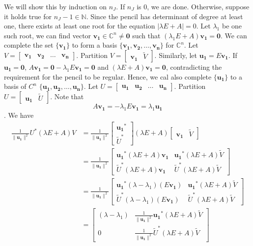 \documentclass{article}
\newcommand{\0}{\mathbf{0}}
\newcommand{\pen}[2]{\lambda#1+#2}
\newcommand{\penEA}{\pen{E}{A}}
\newcommand{\C}{\mathbb{C}}
\newcommand{\N}{\mathbb{N}}
\renewcommand{\vec}{\mathbf}
\begin{document}
We will show this by induction on $n_J$.
If $n_J$ is $0$, we are done.
Otherwise, suppose it holds true for $n_J-1 \in \N$.
Since the pencil has determinant of degree at least one, there exists at least one root for the equation $|\penEA|=0$.
Let $\lambda_1$ be one such root, we can find vector $\vec{v_1} \in \C^n \neq \0$ such that $(\lambda_1E+A)\vec{v_1}=\0$.
We can complete the set $\{\vec{v_1}\}$ to form a basis $\{\vec{v_1},\vec{v_2},\dots,\vec{v_n}\}$ for $\C^n$.
Let $V=\left[\begin{matrix}\vec{v_1}&\vec{v_2}&\dots&\vec{v_n}\end{matrix}\right]$.
Partition $V=\left[\begin{matrix}\vec{v_1}&\tilde{V}\end{matrix}\right]$.
Similarly, let $\vec{u_1}=E\vec{v_1}$.
If $\vec{u_1}=\0$, $A\vec{v_1}=\0-\lambda_1E\vec{v_1}=\0$ and $(\penEA)\vec{v_1}=\0$, contradicting the requirement for the pencil to be regular.
Hence, we cal also complete $\{\vec{u_1}\}$ to a basis of $C^n$ $\{\vec{u_1},\vec{u_2},\dots,\vec{u_n}\}$.
Let $U=\left[\begin{matrix}\vec{u_1}&\vec{u_2}&\dots&\vec{u_n}\end{matrix}\right]$. Partition $U=\left[\begin{matrix}\vec{u_1}&\tilde{U}\end{matrix}\right]$.
Note that \[A\vec{v_1}=-\lambda_1E\vec{v_1}=\lambda_1\vec{u_1}\].
We have
\begin{align*}
    \frac{1}{\lVert\vec{u_1}\rVert^2}U^*(\lambda E + A)V
    &=\frac{1}{\lVert\vec{u_1}\rVert^2}\begin{bmatrix}\vec{u_1}^*\\\tilde{U}^*\end{bmatrix}(\lambda E+A)\begin{bmatrix}\vec{v_1}&\tilde{V}\end{bmatrix}\\
    &=\frac{1}{\lVert\vec{u_1}\rVert^2}\begin{bmatrix}\vec{u_1}^*(\lambda E+A)\vec{v_1}&\vec{u_1}^*(\lambda E+A)\tilde{V}\\\tilde{U}^*(\lambda E+A)\vec{v_1}&\tilde{U}^*(\lambda E+A)\tilde{V}\end{bmatrix}\\
    &=\frac{1}{\lVert\vec{u_1}\rVert^2}\begin{bmatrix}\vec{u_1}^*(\lambda-\lambda_1)(E\vec{v_1})&\vec{u_1}^*(\lambda E+A)\tilde{V}\\\tilde{U}^*(\lambda-\lambda_1)(E\vec{v_1})&\tilde{U}^*(\lambda E+A)\tilde{V}\end{bmatrix}\\
    &=\begin{bmatrix}(\lambda-\lambda_1)&\frac{1}{\lVert\vec{u_1}\rVert^2}\vec{u_1}^*(\lambda E+A)\tilde{V}\\0&\frac{1}{\lVert\vec{u_1}\rVert^2}\tilde{U}^*(\lambda E+A)\tilde{V}\end{bmatrix}\\
\end{align*}
\end{document}
